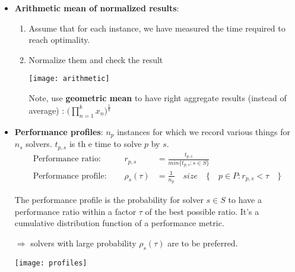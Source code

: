 \begin{itemize}
    \item \textbf{Arithmetic mean of normalized results}: 
        \begin{enumerate}
            \item Assume that for each instance, we have
                measured the time required to reach optimality.
            \item Normalize them and check the result
                \begin{center}
                    \texttt{[image: arithmetic]}
                \end{center}

                Note, use \textbf{geometric mean} to have right 
                aggregate results (instead of average) : $\bigg(\prod_{n=1}^k
                x_n\bigg)^{\frac{1}{k}}$

        \end{enumerate}


    \item \textbf{Performance profiles}: $n_p$ instances for which we record various
        things for $n_s$ solvers. $t_{p,s}$ is th e time to solve $p$ by
        $s$.
        \begin{eqnarray*}
            \textrm{Performance ratio: } & \quad r_{p,s} &=
            \frac{t_{p,s}}{min\{t_{p,s}: s\in S\}}\\
            \textrm{Performance profile: } & \quad \rho_s(\tau)&=
    \frac{1}{n_p} \quad size \quad \{\quad p \in P: r_{p,s} < \tau\quad \}
    \end{eqnarray*}

    The performance profile is the probability for solver $s \in S$ to
    have a performance ratio within a factor $\tau$ of the best possible
    ratio. It's a cumulative distribution function of a performance
    metric.

    $\Rightarrow$ solvers with large probability $\rho_s(\tau)$ are to
    be preferred.
                \begin{center}
                    \texttt{[image: profiles]}
                \end{center}



\end{itemize}


